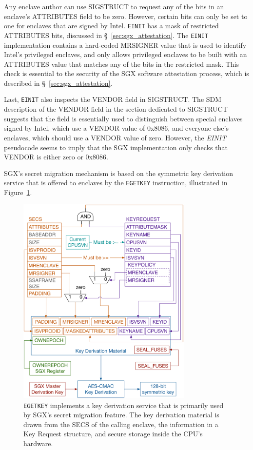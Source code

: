 Any enclave author can use SIGSTRUCT to request any of the bits in an enclave's
ATTRIBUTES field to be zero. However, certain bits can only be set to one for
enclaves that are signed by Intel. \texttt{EINIT} has a mask of restricted
ATTRIBUTES bits, discussed in \S~\ref{sec:sgx_attestation}. The \texttt{EINIT}
implementation contains a hard-coded MRSIGNER value that is used to identify
Intel's privileged enclaves, and only allows privileged enclaves to be built
with an ATTRIBUTES value that matches any of the bits in the restricted mask.
This check is essential to the security of the SGX software attestation process,
which is described in \S~\ref{sec:sgx_attestation}.

Last, \texttt{EINIT} also inspects the VENDOR field in SIGSTRUCT. The SDM
description of the VENDOR field in the section dedicated to SIGSTRUCT suggests
that the field is essentially used to distinguish between special enclaves
signed by Intel, which use a VENDOR value of 0x8086, and everyone else's
enclaves, which should use a VENDOR value of zero. However, the \textit{EINIT}
pseudocode seems to imply that the SGX implementation only checks that
VENDOR is either zero or 0x8086.


\label{sec:sgx_egetkey}

SGX's secret migration mechanism is based on the symmetric key derivation
service that is offered to enclaves by the \texttt{EGETKEY} instruction,
illustrated in Figure~\ref{fig:sgx_egetkey}.

\begin{figure}[hbt]
  \centering
  \includegraphics[width=87mm]{figures/sgx_egetkey.pdf}
  \caption{
    \texttt{EGETKEY} implements a key derivation service that is primarily used
    by SGX's secret migration feature. The key derivation material is drawn
    from the SECS of the calling enclave, the information in a Key Request
    structure, and secure storage inside the CPU's hardware.
  }
  \label{fig:sgx_egetkey}
\end{figure}

